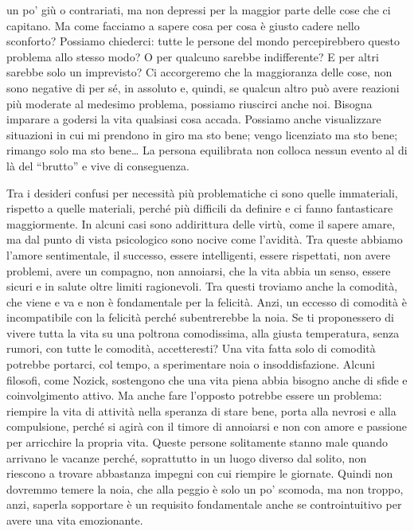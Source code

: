 \documentclass[12pt]{book} %
\begin{document}
un po' giù o contrariati, ma non depressi per la maggior parte delle cose che ci capitano. Ma come
facciamo a sapere cosa per cosa è giusto cadere nello sconforto? Possiamo chiederci: tutte le persone del mondo
percepirebbero questo problema allo stesso modo? O per qualcuno sarebbe indifferente? E per altri sarebbe solo un
imprevisto? Ci accorgeremo che la maggioranza delle cose, non sono negative di per sé, in assoluto e, quindi,
se qualcun altro può avere reazioni più moderate al medesimo problema, possiamo riuscirci anche noi. Bisogna imparare a
godersi la vita qualsiasi cosa accada. Possiamo anche visualizzare situazioni in cui mi prendono in giro ma sto bene;
vengo licenziato ma sto bene; rimango solo ma sto bene… La persona equilibrata non colloca nessun evento al di là del
“brutto” e vive di conseguenza.

Tra i desideri confusi per necessità più problematiche ci sono quelle immateriali, rispetto a quelle materiali, perché
più difficili da definire e ci fanno fantasticare maggiormente. In alcuni casi sono addirittura delle virtù, come il
sapere amare, ma dal punto di vista psicologico sono nocive come l'avidità. Tra queste abbiamo
l'amore sentimentale, il successo, essere intelligenti, essere rispettati, non avere problemi,
avere un compagno, non annoiarsi, che la vita abbia un senso, essere sicuri e in salute oltre limiti ragionevoli. Tra
questi troviamo anche la comodità, che viene e va e non è fondamentale per la felicità. Anzi, un eccesso di comodità è
incompatibile con la felicità perché subentrerebbe la noia. Se ti proponessero di vivere tutta la vita su una poltrona
comodissima, alla giusta temperatura, senza rumori, con tutte le comodità, accetteresti? 
Una vita fatta solo di comodità potrebbe portarci, col tempo, a sperimentare noia o insoddisfazione. Alcuni filosofi, come Nozick, sostengono che una vita piena abbia bisogno anche di sfide e coinvolgimento attivo. Ma anche fare l'opposto potrebbe essere un problema:
riempire la vita di attività nella speranza di stare bene, porta alla nevrosi e alla compulsione, perché si agirà con
il timore di annoiarsi e non con amore e passione per arricchire la propria vita. Queste persone solitamente stanno
male quando arrivano le vacanze perché, soprattutto in un luogo diverso dal solito, non riescono a trovare abbastanza
impegni con cui riempire le giornate. Quindi non dovremmo temere la noia, che alla peggio è solo un
po' scomoda, ma non troppo, anzi, saperla sopportare è un requisito fondamentale anche se
controintuitivo per avere una vita emozionante.
\end{document}
